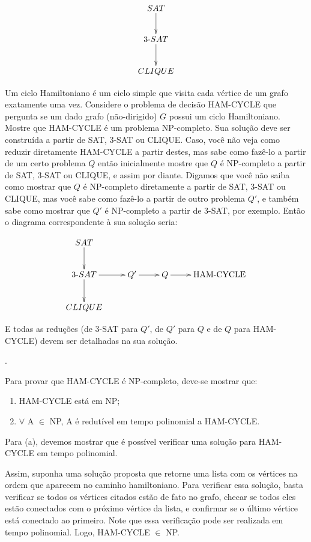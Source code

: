 \documentclass[12pt]{article}
\newcommand{\resposta}[1]{ \noindent {\bf Solução}.{\color{blue} #1}}
\begin{document}
\begin{enumerate}
  $$\xymatrix{
    SAT \ar[d] \\
    3\mbox{-}SAT \ar[d] \\
    CLIQUE 
  }$$
  
  Um ciclo Hamiltoniano é um ciclo simple que visita cada vértice de
  um grafo exatamente uma vez. Considere o problema de decisão
  HAM-CYCLE que pergunta se um dado grafo (não-dirigido) $G$ possui um
  ciclo Hamiltoniano. Mostre que HAM-CYCLE é um problema
  NP-completo. Sua solução deve ser construída a partir de SAT, 3-SAT
  ou CLIQUE. Caso, você não veja como reduzir diretamente HAM-CYCLE a
  partir destes, mas sabe como fazê-lo a partir de um certo problema
  $Q$ então inicialmente mostre que $Q$ é NP-completo a partir de SAT,
  3-SAT ou CLIQUE, e assim por diante. Digamos que você não saiba como
  mostrar que $Q$ é NP-completo diretamente a partir de SAT, 3-SAT ou
  CLIQUE, mas você sabe como fazê-lo a partir de outro problema $Q'$,
  e também sabe como mostrar que $Q'$ é NP-completo a partir de 3-SAT,
  por exemplo. Então o diagrama correspondente à sua solução seria:

$$\xymatrix{
  SAT \ar[d] & & & \\
  3\mbox{-}SAT \ar[d]\ar[r] & Q' \ar[r] & Q \ar[r] & \mbox{HAM-CYCLE}  \\
  CLIQUE & & & 
}$$

E todas as reduções (de 3-SAT para $Q'$, de $Q'$ para $Q$ e de $Q$ para HAM-CYCLE) devem ser detalhadas na sua solução.

\resposta{

    Para provar que HAM-CYCLE é NP-completo, deve-se mostrar que:
    
\begin{enumerate}
\item HAM-CYCLE está em NP;
\item $\forall$ A $\in$ NP, A é redutível em tempo polinomial a HAM-CYCLE.
\end{enumerate}
	Para (a), devemos mostrar que é possível verificar uma solução para HAM-CYCLE em tempo polinomial. 
    
    Assim, suponha uma solução proposta que retorne uma lista com os vértices na ordem que aparecem no caminho hamiltoniano. Para verificar essa solução, basta verificar se todos os vértices citados estão de fato no grafo, checar se todos eles estão conectados com o próximo vértice da lista, e confirmar se o último vértice está conectado ao primeiro. Note que essa verificação pode ser realizada em tempo polinomial. Logo, HAM-CYCLE $\in$ NP.

}
\end{enumerate}
\end{document}
